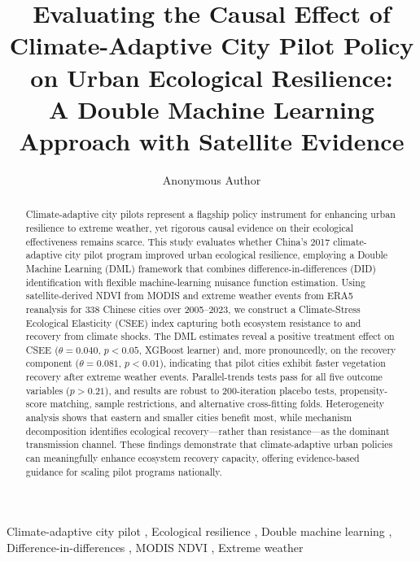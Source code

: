 \documentclass[review,3p,times,authoryear]{elsarticle}
\begin{document}
\begin{frontmatter}

\title{Evaluating the Causal Effect of Climate-Adaptive City Pilot Policy
       on Urban Ecological Resilience: \\
       A Double Machine Learning Approach with Satellite Evidence}

\author[1]{Anonymous Author}

\address[1]{Department of Environmental Science, Anonymous University, China}

\begin{abstract}
Climate-adaptive city pilots represent a flagship policy instrument for
enhancing urban resilience to extreme weather, yet rigorous causal evidence
on their ecological effectiveness remains scarce. This study evaluates
whether China's 2017 climate-adaptive city pilot program improved urban
ecological resilience, employing a Double Machine Learning (DML) framework
that combines difference-in-differences (DID) identification with flexible
machine-learning nuisance function estimation. Using satellite-derived
NDVI from MODIS and extreme weather events from ERA5 reanalysis for 338
Chinese cities over 2005--2023, we construct a Climate-Stress Ecological
Elasticity (CSEE) index capturing both ecosystem resistance to and recovery
from climate shocks. The DML estimates reveal a positive treatment effect
on CSEE ($\theta = 0.040$, $p < 0.05$, XGBoost learner) and, more
pronouncedly, on the recovery component ($\theta = 0.081$, $p < 0.01$),
indicating that pilot cities exhibit faster vegetation recovery after
extreme weather events. Parallel-trends tests pass for all five outcome
variables ($p > 0.21$), and results are robust to 200-iteration placebo
tests, propensity-score matching, sample restrictions, and alternative
cross-fitting folds. Heterogeneity analysis shows that eastern and smaller
cities benefit most, while mechanism decomposition identifies ecological
recovery---rather than resistance---as the dominant transmission channel.
These findings demonstrate that climate-adaptive urban policies can
meaningfully enhance ecosystem recovery capacity, offering evidence-based
guidance for scaling pilot programs nationally.
\end{abstract}

\begin{keyword}
Climate-adaptive city pilot \sep
Ecological resilience \sep
Double machine learning \sep
Difference-in-differences \sep
MODIS NDVI \sep
Extreme weather
\end{keyword}

\end{frontmatter}











\end{document}
